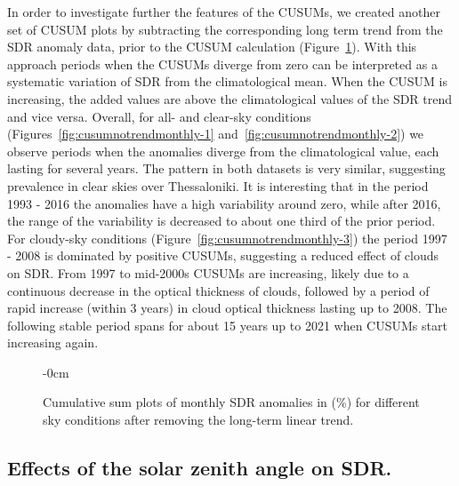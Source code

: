 \documentclass[applsci,article,submit,moreauthors,pdftex]{Definitions/mdpi}
\begin{document}
In order to investigate further the features of the CUSUMs, we created
another set of CUSUM plots by subtracting the corresponding long term
trend from the SDR anomaly data, prior to the CUSUM calculation
(Figure~\ref{fig:cusumnotrendmonthly}). With this approach periods when
the CUSUMs diverge from zero can be interpreted as a systematic
variation of SDR from the climatological mean. When the CUSUM is
increasing, the added values are above the climatological values of the
SDR trend and vice versa. Overall, for all- and clear-sky conditions
(Figures~\ref{fig:cusumnotrendmonthly-1}
and~\ref{fig:cusumnotrendmonthly-2}) we observe periods when the
anomalies diverge from the climatological value, each lasting for
several years. The pattern in both datasets is very similar, suggesting
prevalence in clear skies over Thessaloniki. It is interesting that in
the period 1993 - 2016 the anomalies have a high variability around
zero, while after 2016, the range of the variability is decreased to
about one third of the prior period. For cloudy-sky conditions
(Figure~\ref{fig:cusumnotrendmonthly-3}) the period 1997 - 2008 is
dominated by positive CUSUMs, suggesting a reduced effect of clouds on
SDR. From 1997 to mid-2000s CUSUMs are increasing, likely due to a
continuous decrease in the optical thickness of clouds, followed by a
period of rapid increase (within 3 years) in cloud optical thickness
lasting up to 2008. The following stable period spans for about 15 years
up to 2021 when CUSUMs start increasing again.

\begin{figure}[h!]
    \begin{adjustwidth}{-\extralength}{0cm}
        {\centering 
            \hfill
            \hfill
        }
        \caption{Cumulative sum plots of monthly SDR anomalies in (\%) for different sky conditions after removing the long-term linear trend.}\label{fig:cusumnotrendmonthly}
\end{adjustwidth}
\end{figure}

\hypertarget{effects-of-the-solar-zenith-angle-on-sdr.}{%
\subsection{Effects of the solar zenith angle on
SDR.}\label{effects-of-the-solar-zenith-angle-on-sdr.}}
\end{document}
